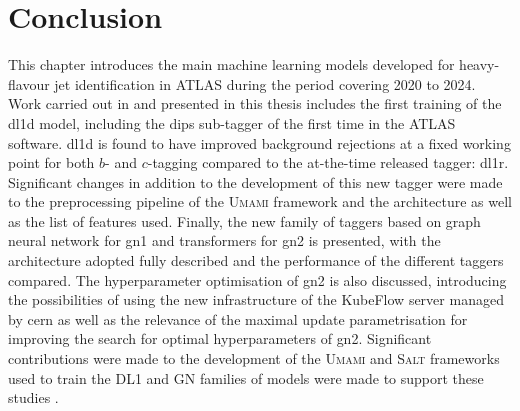 \section{Conclusion}
This chapter introduces the main machine learning models developed for heavy-flavour jet identification in ATLAS during the period covering 2020 to 2024. Work carried out in and presented in this thesis includes the first training of the \gls{dl1d} model, including the \gls{dips} sub-tagger of the first time in the ATLAS software. \gls{dl1d} is found to have improved background rejections at a fixed working point for both $b$- and $c$-tagging compared to the at-the-time released tagger: \gls{dl1r}. Significant changes in addition to the development of this new tagger were made to the preprocessing pipeline of the \textsc{Umami} framework \cite{UmamiCite} and the architecture as well as the list of features used. Finally, the new family of taggers based on graph neural network for \gls{gn1} and transformers for \gls{gn2} is presented, with the architecture adopted fully described and the performance of the different taggers compared. The hyperparameter optimisation of \gls{gn2} is also discussed, introducing the possibilities of using the new infrastructure of the KubeFlow server managed by \gls{cern} as well as the relevance of the maximal update parametrisation for improving the search for optimal hyperparameters of \gls{gn2}. Significant contributions were made to the development of the \textsc{Umami} and \textsc{Salt} frameworks used to train the DL1 and GN families of models were made to support these studies \cite{UmamiCite, SaltCite}. 

